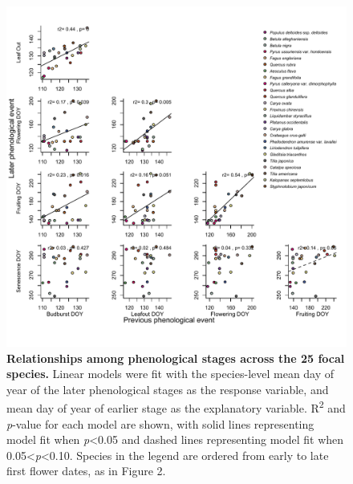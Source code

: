 \documentclass{article}
\begin{document}
  \begin{figure}[h]
  \centering
  \includegraphics{../analyses/figures/latevearly_rp_col_legend.pdf}
  
  \caption{\textbf{Relationships among phenological stages across the 25 focal species.} Linear models were fit with the species-level mean day of year of the later phenological stages as the response variable, and mean day of year of earlier stage as the explanatory variable. R\textsuperscript{2} and \textit{p}-value for each model are shown, with solid lines representing model fit when \textit{p}<0.05 and dashed lines representing model fit when 0.05<\textit{p}<0.10. Species in the legend are ordered from early to late first flower dates, as in Figure 2.}
  \label{fig:latevearly}
\end{figure}
\end{document}
